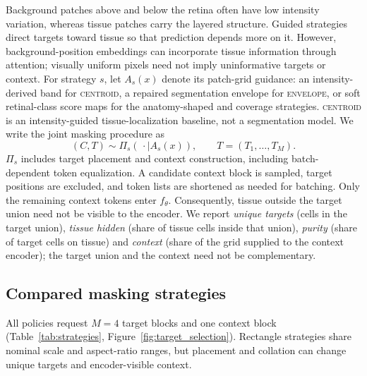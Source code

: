 \documentclass{article}
\newcommand{\ArmBest}{\textsc{centroid}}
\begin{document}
Background patches above and below the retina often have low intensity
variation, whereas tissue patches carry the layered structure. Guided strategies
direct targets toward tissue so that prediction depends more on it. However,
background-position embeddings can incorporate tissue information through
attention; visually uniform pixels need not imply uninformative targets or context.
For strategy $s$, let $A_s(x)$ denote its patch-grid guidance:
an intensity-derived band for \ArmBest{}, a repaired segmentation envelope
for \textsc{envelope}, or soft retinal-class score maps for the anatomy-shaped
and coverage strategies. \ArmBest{} is an intensity-guided tissue-localization
baseline, not a segmentation model. We write the joint masking procedure as
\begin{equation}
 (C,T)\sim\Pi_s(\,\cdot\mid A_s(x)),
 \qquad T=(T_1,\ldots,T_M).
 \label{eq:selection}
\end{equation}
$\Pi_s$ includes target placement and context construction,
including batch-dependent token equalization.
A candidate context block is sampled, target positions are
excluded, and token lists are shortened as needed for batching. Only the
remaining context tokens enter $f_\theta$. Consequently, tissue outside the
target union need not be visible to the encoder.
We report \emph{unique targets} (cells in the target union), \emph{tissue
hidden} (share of tissue cells inside that union), \emph{purity} (share of
target cells on tissue) and \emph{context} (share of the grid supplied to the
context encoder); the target union and the context need not be complementary.

\subsection{Compared masking strategies}

All policies request $M{=}4$ target blocks and one context block
(Table~\ref{tab:strategies}, Figure~\ref{fig:target_selection}). Rectangle
strategies share nominal scale and aspect-ratio ranges, but placement and
collation can change unique targets and encoder-visible context.
\end{document}
